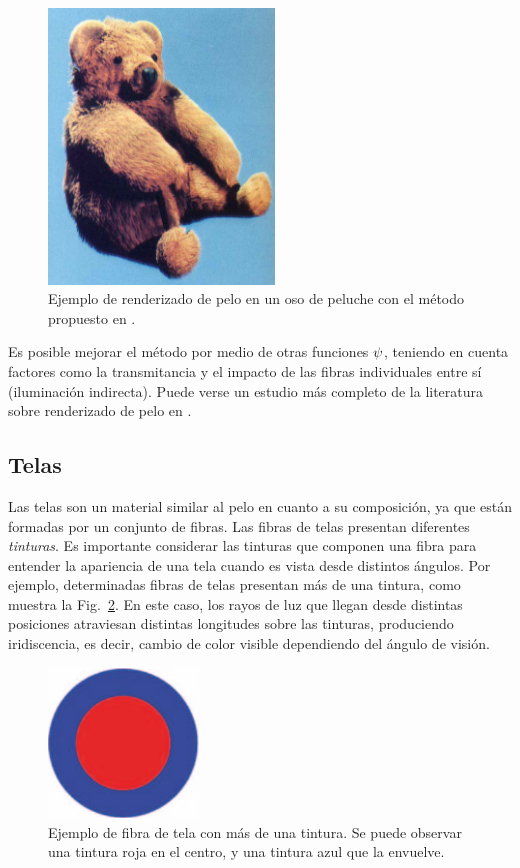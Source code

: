 \begin{figure}
\center
\includegraphics[width=6cm]{figures/osopelo}
\caption[Renderizado de pelo en un oso de peluche]{Ejemplo de renderizado de pelo en un oso de peluche con el método propuesto en \cite{Kajiya1989}.}
\label{fg:osopelo}
\end{figure}


Es posible mejorar el método por medio de otras funciones $\bold{\psi}$, teniendo en cuenta factores como la transmitancia y el impacto de las fibras individuales entre sí (iluminación indirecta).
Puede verse un estudio más completo de la literatura sobre renderizado de pelo en \cite{Ward2007}.

\subsection{Telas}
Las telas son un material similar al pelo en cuanto a su composición, ya que están formadas por un conjunto de fibras.
Las fibras de telas presentan diferentes {\em tinturas}.
Es importante considerar las tinturas que componen una fibra para entender la apariencia de una tela cuando es vista desde distintos ángulos.
Por ejemplo, determinadas fibras de telas presentan más de una tintura, como muestra la Fig.~\ref{fg:fibra}.
En este caso, los rayos de luz que llegan desde distintas posiciones atraviesan distintas longitudes sobre las tinturas, produciendo iridiscencia, es decir, cambio de color visible dependiendo del ángulo de visión.

\begin{figure}
\center
\includegraphics[width=4cm]{figures/fibra}
\caption[Ejemplo de fibra de tela con más de una tintura]{Ejemplo de fibra de tela con más de una tintura. Se puede observar una tintura roja en el centro, y una tintura azul que la envuelve.}
\label{fg:fibra}
\end{figure}

